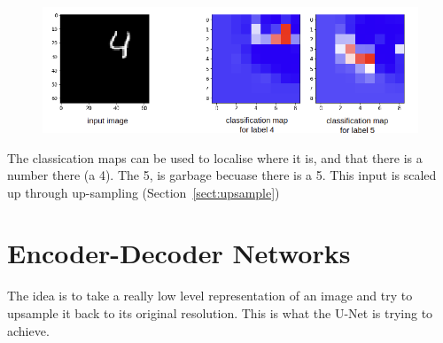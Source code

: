\documentclass[11pt]{article}
\begin{document}
\begin{figure}[H]
    \centering
    \includegraphics[width=.8\linewidth]{figures/LeNet-feature-map.png}
\end{figure}

The classication maps can be used to localise where it is, and that there is a number there (a 4). The 5, is garbage becuase there is a 5. This input is scaled up through up-sampling (Section~\ref{sect:upsample})


\section{Encoder-Decoder Networks}

\begin{figure}[H]
    \centering
\end{figure}

\begin{figure}[H]
    \centering
\end{figure}

The idea is to take a really low level representation of an image and try to upsample it back to its original resolution. This is what the U-Net is trying to achieve.
\end{document}
